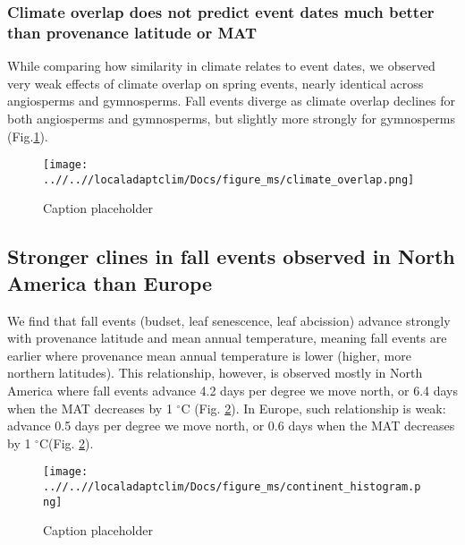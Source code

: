 \documentclass{article}
\begin{document}
\newpage
\subsubsection {Climate overlap does not predict event dates much better than provenance latitude or MAT}

While comparing how similarity in climate relates to event dates, we observed very weak effects of climate overlap on spring events, nearly identical across angiosperms and gymnosperms. Fall events diverge as climate overlap declines for both angiosperms and gymnosperms, but slightly more strongly for gymnosperms (Fig.\ref{figure:overlap}).

\begin{figure}[!h] 
    \centering
 \texttt{[image: ..//..//localadaptclim/Docs/figure\_ms/climate\_overlap.png]}
    \caption{Caption placeholder}
    \label{figure:overlap}
\end{figure}


\subsection{Stronger clines in fall events observed in North America than Europe}





We find that fall events (budset, leaf senescence, leaf abcission) advance strongly with provenance latitude and mean annual temperature, meaning fall events are earlier where provenance mean annual temperature is lower (higher, more northern latitudes). This relationship, however, is observed mostly in North America where fall events advance 4.2 days per degree we move north, or 6.4 days when the MAT decreases by 1 $^{\circ}$C (Fig. \ref{figure:continent}). In Europe, such relationship is weak: advance 0.5 days per degree we move north, or 0.6 days when the MAT decreases by 1 $^{\circ}$C(Fig. \ref{figure:continent}).

\begin{figure}[!h] 
    \centering
 \texttt{[image: ..//..//localadaptclim/Docs/figure\_ms/continent\_histogram.png]}
    \caption{Caption placeholder}
    \label{figure:continent}
\end{figure}
\end{document}
